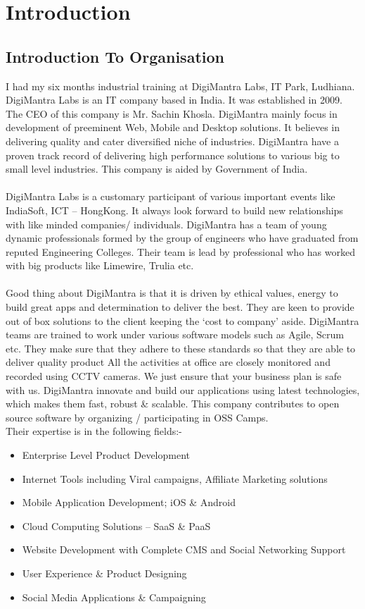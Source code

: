 \chapter{Introduction}
\section{Introduction To Organisation}
I had my six months industrial training at DigiMantra Labs, IT Park, Ludhiana.
DigiMantra Labs is an IT company based in India. It was established in 2009. The CEO of this company is Mr. Sachin Khosla. DigiMantra mainly focus in development of preeminent Web, Mobile and Desktop solutions. It believes  in delivering quality and cater diversified niche of industries. DigiMantra have a proven track record of delivering high performance solutions to various big to small level industries. This company is aided by Government of India.\\\\
DigiMantra Labs is a customary participant of various important events like IndiaSoft, ICT – HongKong. It always look forward to build new relationships with like minded companies/ individuals. 
DigiMantra has a  team of young dynamic professionals formed by the group of engineers who have graduated from reputed Engineering Colleges. Their team is lead by professional who has worked with big products like Limewire, Trulia etc. 
\\\\
Good thing about DigiMantra is that it is driven by ethical values, energy to build great apps and determination to deliver the best. They are keen to provide out of box solutions to the client keeping the ‘cost to company’ aside.
 DigiMantra teams are trained to work under various software models such as Agile, Scrum etc. They make sure that they adhere to these standards so that they are able to deliver quality product 
 All the activities at office are closely monitored and recorded using CCTV cameras. We just ensure that your business plan is safe with us.
DigiMantra innovate and build our applications using latest technologies, which makes them fast, robust \& scalable. This company contributes to open source software by organizing / participating in OSS Camps.\\
Their expertise is in the following fields:-\\
\begin{itemize}
\item Enterprise Level Product Development 
\item Internet Tools including Viral campaigns, Affiliate Marketing solutions 
\item Mobile Application Development; iOS \& Android 
\item Cloud Computing Solutions – SaaS \& PaaS 
\item Website Development with Complete CMS and Social Networking Support 
\item User Experience \& Product Designing 
\item Social Media Applications \& Campaigning 
 \end{itemize}
